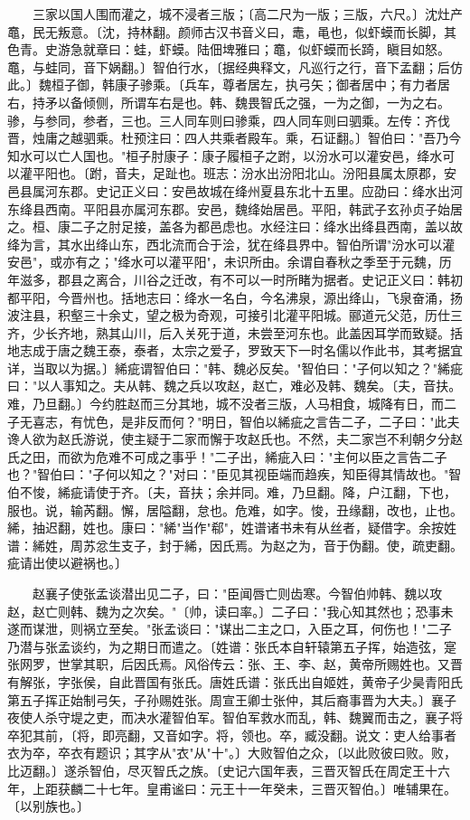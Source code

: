 　　三家以国人围而灌之，城不浸者三版；〔高二尺为一版；三版，六尺。〕沈灶产鼁，民无叛意。〔沈，持林翻。颜师古汉书音义曰，鼃，黾也，似虾蟆而长脚，其色青。史游急就章曰：蛙，虾蟆。陆佃埤雅曰；鼁，似虾蟆而长踦，瞋目如怒。鼁，与蛙同，音下娲翻。〕智伯行水，〔据经典释文，凡巡行之行，音下孟翻；后仿此。〕魏桓子御，韩康子骖乘。〔兵车，尊者居左，执弓矢；御者居中；有力者居右，持矛以备倾侧，所谓车右是也。韩、魏畏智氏之强，一为之御，一为之右。骖，与参同，参者，三也。三人同车则曰骖乘，四人同车则曰驷乘。左传：齐伐晋，烛庸之越驷乘。杜预注曰：四人共乘者殿车。乘，石证翻。〕智伯曰："吾乃今知水可以亡人国也。"桓子肘康子：康子履桓子之跗，以汾水可以灌安邑，绛水可以灌平阳也。〔跗，音夫，足趾也。班志：汾水出汾阳北山。汾阳县属太原郡，安邑县属河东郡。史记正义曰：安邑故城在绛州夏县东北十五里。应劭曰：绛水出河东绛县西南。平阳县亦属河东郡。安邑，魏绛始居邑。平阳，韩武子玄孙贞子始居之。桓、康二子之肘足接，盖各为都邑虑也。水经注曰：绛水出绛县西南，盖以故绛为言，其水出绛山东，西北流而合于浍，犹在绛县界中。智伯所谓"汾水可以灌安邑"，或亦有之；"绛水可以灌平阳"，未识所由。余谓自春秋之季至于元魏，历年滋多，郡县之离合，川谷之迁改，有不可以一时所睹为据者。史记正义曰：韩初都平阳，今晋州也。括地志曰：绛水一名白，今名沸泉，源出绛山，飞泉奋涌，扬波注县，积壑三十余丈，望之极为奇观，可接引北灌平阳城。郦道元父范，历仕三齐，少长齐地，熟其山川，后入关死于道，未尝至河东也。此盖因耳学而致疑。括地志成于唐之魏王泰，泰者，太宗之爱子，罗致天下一时名儒以作此书，其考据宜详，当取以为据。〕絺疵谓智伯曰："韩、魏必反矣。"智伯曰："子何以知之？"絺疵曰："以人事知之。夫从韩、魏之兵以攻赵，赵亡，难必及韩、魏矣。〔夫，音扶。难，乃旦翻。〕今约胜赵而三分其地，城不没者三版，人马相食，城降有日，而二子无喜志，有忧色，是非反而何？"明日，智伯以絺疵之言告二子，二子曰："此夫谗人欲为赵氏游说，使主疑于二家而懈于攻赵氏也。不然，夫二家岂不利朝夕分赵氏之田，而欲为危难不可成之事乎！"二子出，絺疵入曰："主何以臣之言告二子也？"智伯曰："子何以知之？"对曰："臣见其视臣端而趋疾，知臣得其情故也。"智伯不悛，絺疵请使于齐。〔夫，音扶；余并同。难，乃旦翻。降，户江翻，下也，服也。说，输芮翻。懈，居隘翻，怠也。危难，如字。悛，丑缘翻，改也，止也。絺，抽迟翻，姓也。康曰："絺"当作"郗"，姓谱诸书未有从丝者，疑借字。余按姓谱：絺姓，周苏忿生支子，封于絺，因氏焉。为赵之为，音于伪翻。使，疏吏翻。疵请出使以避祸也。〕

　　赵襄子使张孟谈潜出见二子，曰："臣闻唇亡则齿寒。今智伯帅韩、魏以攻赵，赵亡则韩、魏为之次矣。"〔帅，读曰率。〕二子曰："我心知其然也；恐事未遂而谋泄，则祸立至矣。"张孟谈曰："谋出二主之口，入臣之耳，何伤也！"二子乃潜与张孟谈约，为之期日而遣之。〔姓谱：张氏本自轩辕第五子挥，始造弦，寔张网罗，世掌其职，后因氏焉。风俗传云：张、王、李、赵，黄帝所赐姓也。又晋有解张，字张侯，自此晋国有张氏。唐姓氏谱：张氏出自姬姓，黄帝子少昊青阳氏第五子挥正始制弓矢，子孙赐姓张。周宣王卿士张仲，其后裔事晋为大夫。〕襄子夜使人杀守堤之吏，而决水灌智伯军。智伯军救水而乱，韩、魏翼而击之，襄子将卒犯其前，〔将，即亮翻，又音如字。将，领也。卒，臧没翻。说文：吏人给事者衣为卒，卒衣有题识；其字从"衣"从"十"。〕大败智伯之众，〔以此败彼曰败。败，比迈翻。〕遂杀智伯，尽灭智氏之族。〔史记六国年表，三晋灭智氏在周定王十六年，上距获麟二十七年。皇甫谧曰：元王十一年癸未，三晋灭智伯。〕唯辅果在。〔以别族也。〕

